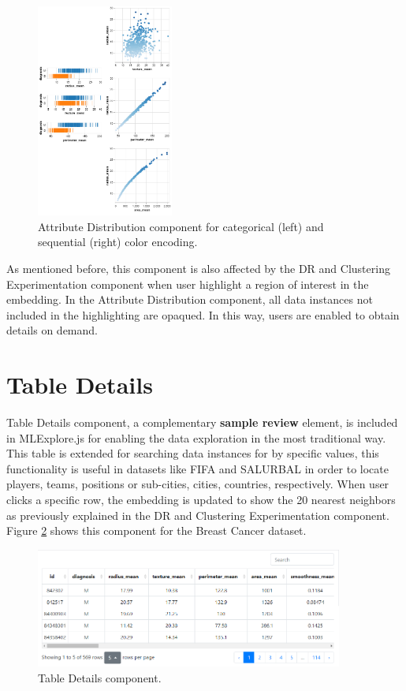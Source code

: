\begin{figure}[ht]
 \centering
 \includegraphics[width=0.4\textwidth]{attribute-distribution.png}
 \caption{Attribute Distribution component for categorical (left) and sequential (right) color encoding.}
 \label{fig:attribute-distribution-component}
\end{figure}

As mentioned before, this component is also affected by the DR and Clustering Experimentation component when user highlight a region of interest in the embedding. In the Attribute Distribution component, all data instances not included in the highlighting are opaqued. In this way, users are enabled to obtain details on demand.

\section{Table Details}
\label{section3.6}

Table Details component, a complementary \textbf{sample review} element, is included in MLExplore.js for enabling the data exploration in the most traditional way. This table is extended for searching data instances for by specific values, this functionality is useful in datasets like FIFA and SALURBAL in order to locate players, teams, positions or sub-cities, cities, countries, respectively. When user clicks a specific row, the embedding is updated to show the 20 nearest neighbors as previously explained in the DR and Clustering Experimentation component. Figure \ref{fig:table-details-component} shows this component for the Breast Cancer dataset.

\begin{figure}[ht]
 \centering
 \includegraphics[width=0.9\textwidth]{table-details.png}
 \caption{Table Details component.}
 \label{fig:table-details-component}
\end{figure}

